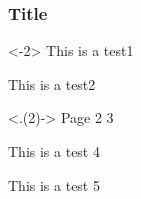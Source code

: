 \documentclass{beamer}
\begin{document}
\begin{frame}[<+->]
\frametitle{Title}

    \begin{onlyenv}<-2>
        This is a test1

        \pause

        This is a test2
    \end{onlyenv}

    \begin{onlyenv}<.(2)->
        Page 2 3

        \pause
        \pause  

        This is a test 4

        \pause

        This is a test 5
    \end{onlyenv}

\end{frame}
\end{document}
